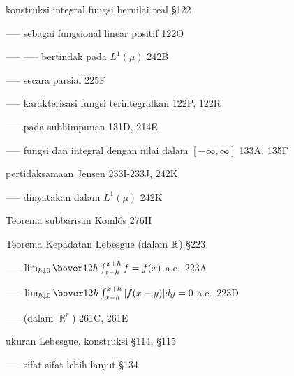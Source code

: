  konstruksi integral fungsi bernilai real \S122

----- sebagai fungsional linear positif 122O

----- ----- bertindak pada $L^1(\mu)$ 242B

----- secara parsial 225F

----- karakterisasi fungsi terintegralkan 122P, 122R

----- pada subhimpunan 131D, 214E

----- fungsi dan integral dengan nilai dalam $[-\infty,\infty]$ 133A, 135F




























\indexmedskip



pertidaksamaan Jensen 233I-233J, 242K

----- dinyatakan dalam $L^1(\mu)$ 242K

\indexmedskip









 Teorema subbarisan Koml\'os 276H



\indexmedskip

 Teorema Kepadatan Lebesgue (dalam $\Bbb R$) \S223

----- $\lim_{h\downarrow 0}\bover1{2h}\int_{x-h}^{x+h}f=f(x)$ a.e.\
223A


-----
$\lim_{h\downarrow 0}\bover1{2h}\int_{x-h}^{x+h}|f(x-y)|dy=0$ a.e.\ 223D


----- (dalam $\BbbR^r$) 261C, 261E





ukuran Lebesgue, konstruksi \S114, \S115

----- sifat-sifat lebih lanjut \S134



